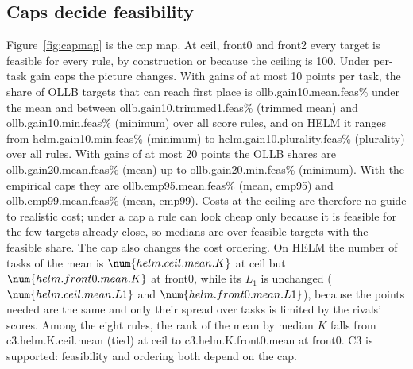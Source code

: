 \subsection{Caps decide feasibility}\label{sec:caps}
Figure~\ref{fig:capmap} is the cap map. At \textsf{ceil}, \textsf{front0} and \textsf{front2} every target is feasible for every rule, by construction or because the ceiling is 100. Under per-task gain caps the picture changes. With gains of at most 10 points per task, the share of OLLB targets that can reach first place is \num{ollb.gain10.mean.feas}\% under the mean and between \num{ollb.gain10.trimmed1.feas}\% (trimmed mean) and \num{ollb.gain10.min.feas}\% (minimum) over all score rules, and on HELM it ranges from \num{helm.gain10.min.feas}\% (minimum) to \num{helm.gain10.plurality.feas}\% (plurality) over all rules. With gains of at most 20 points the OLLB shares are \num{ollb.gain20.mean.feas}\% (mean) up to \num{ollb.gain20.min.feas}\% (minimum). With the empirical caps they are \num{ollb.emp95.mean.feas}\% (mean, \textsf{emp95}) and \num{ollb.emp99.mean.feas}\% (mean, \textsf{emp99}).
Costs at the ceiling are therefore no guide to realistic cost; under a cap a rule can look cheap only because it is feasible for the few targets already close, so medians are over feasible targets with the feasible share.
The cap also changes the cost ordering. On HELM the number of tasks of the mean is $\num{helm.ceil.mean.K}$ at \textsf{ceil} but $\num{helm.front0.mean.K}$ at \textsf{front0}, while its $L_1$ is unchanged ($\num{helm.ceil.mean.L1}$ and $\num{helm.front0.mean.L1}$), because the points needed are the same and only their spread over tasks is limited by the rivals' scores. Among the eight rules, the rank of the mean by median $K$ falls from \num{c3.helm.K.ceil.mean} (tied) at \textsf{ceil} to \num{c3.helm.K.front0.mean} at \textsf{front0}. C3 is supported: feasibility and ordering both depend on the cap.
